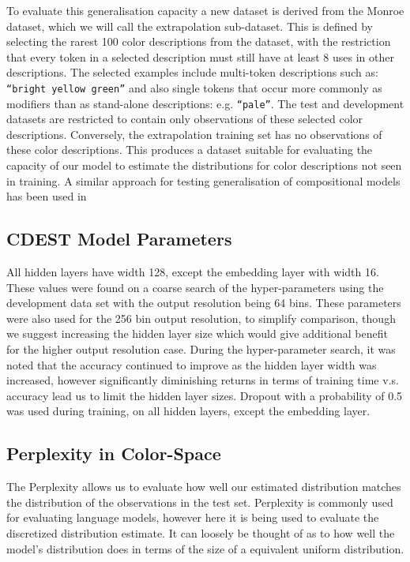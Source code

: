 \documentclass[11pt,letterpaper]{article}
\newcommand{\parencite}{\cite}
\newcommand{\textcite}{\newcite}
\begin{document}
To evaluate this generalisation capacity a new dataset is derived from the Monroe dataset, which we will call the extrapolation sub-dataset.
This is defined by selecting the rarest 100 color descriptions from the dataset,
with the restriction that every token in a selected description must still have at least 8 uses in other descriptions.
The selected examples include multi-token descriptions such as: \texttt{``bright yellow green''} and also single tokens that occur more commonly as modifiers than as stand-alone descriptions: e.g. \texttt{``pale''}.
The test and development datasets are restricted to contain only observations of these selected color descriptions.
Conversely, the extrapolation training set has no observations of these color descriptions.
This produces a dataset suitable for evaluating the capacity of our model to estimate the distributions for color descriptions not seen in training.
A similar approach for testing generalisation of compositional models has been used in \textcite{DBLP:journals/corr/AtzmonBKGC16}

\subsection{CDEST Model Parameters}
All hidden layers have width 128, except the embedding layer with width 16.
These values were found on a coarse search of the hyper-parameters using the development data set with the output resolution being 64 bins.
These parameters were also used for the 256 bin output resolution, to simplify comparison, though we suggest increasing the hidden layer size which would give additional benefit for the higher output resolution case.
During the hyper-parameter search, it was noted that the accuracy continued to improve as the hidden layer width was increased,
however significantly diminishing returns in terms of training time v.s. accuracy lead us to limit the hidden layer sizes.
Dropout \parencite{srivastava2014dropout} with a probability of 0.5 was used during training, on all hidden layers, except the embedding layer.


\subsection{Perplexity in Color-Space}
The Perplexity allows us to evaluate how well our estimated distribution matches the distribution of the observations in the test set.
Perplexity is commonly used for evaluating language models, however here it is being used to evaluate the discretized distribution estimate.
It can loosely be thought of as to how well the model's distribution does in terms of the size of a equivalent uniform distribution.
\end{document}
